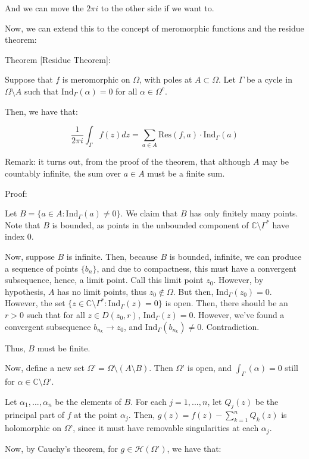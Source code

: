 \documentclass[10pt]{article}
\newcommand{\calH}{\mathcal{H}}
\newcommand{\ind}{\text{Ind}}
\newcommand{\res}{\text{Res}}
\begin{document}
And we can move the $2 \pi i$ to the other side if we want to.

Now, we can extend this to the concept of meromorphic functions and the residue theorem:

Theorem [Residue Theorem]:

Suppose that $f$ is meromorphic on $\Omega$, with poles at $A \subset \Omega$. Let $\Gamma$ be a cycle in $\Omega \setminus A$ such that $\ind_\Gamma(\alpha) = 0$ for all $\alpha \in \Omega^c$. 

Then, we have that:

$$\frac{1}{2\pi i} \int_\Gamma f(z) dz = \sum_{a \in A} \res(f,a) \cdot \ind_\Gamma(a)$$

Remark: it turns out, from the proof of the theorem, that although $A$ may be countably infinite, the sum over $a \in A$ must be a finite sum.

Proof:

Let $B  =   \{ a \in A : \ind_\Gamma(a) \not = 0 \}$. We claim that $B$ has only finitely many points. Note that $B$ is bounded, as points in the unbounded component of $\mathbb{C} \setminus \Gamma^*$ have index 0. 

Now, suppose $B$ is infinite. Then, because $B$ is bounded, infinite, we can produce a sequence of points $\{ b_n \}$, and due to compactness, this must have a convergent subsequence, hence, a limit point. Call this limit point $z_0$. However, by hypothesis, $A$ has no limit points, thus $z_0 \not \in \Omega$. But then, $\ind_\Gamma(z_0) = 0$. However, the set $\{ z \in \mathbb{C} \setminus \Gamma^* : \ind_\Gamma(z) = 0 \}$ is open. Then, there should be an $r > 0 $ such that for all $z \in D(z_0,r)$, $\ind_\Gamma(z) = 0$. However, we’ve found a convergent subsequence $b_{n_k} \to z_0$, and $\ind_\Gamma(b_{n_k}) \not = 0$. Contradiction.

Thus, $B$ must be finite.

Now, define a new set $\Omega’ = \Omega \setminus (A \setminus B)$. Then $\Omega’ $ is open, and $\int_\Gamma(\alpha) = 0$  still for $\alpha \in \mathbb{C} \setminus \Omega’$. 

Let $\alpha_1,...,\alpha_n$ be the elements of $B$. For each $j = 1,...,n$, let $Q_j(z)$ be the principal part of $f$ at the point $\alpha_j$. Then, $g(z) = f(z) - \sum_{k=1}^n Q_k(z)$ is holomorphic on $\Omega’$, since it must have removable singularities at each $\alpha_j$. 

Now, by Cauchy’s theorem, for $g \in \calH(\Omega’)$, we have that:
\end{document}
